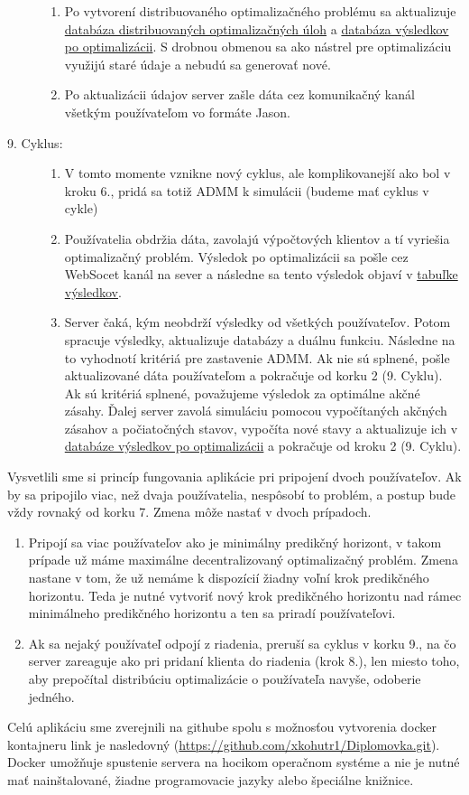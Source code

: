 \begin{description}
{\begin{enumerate}
{		}
		\item{
			Po vytvorení distribuovaného optimalizačného problému sa aktualizuje \hyperref[DB:WORKER]{databáza distribuovaných optimalizačných úloh} a \hyperref[DB:WORKER_DATA]{databáza výsledkov po optimalizácii}. S drobnou obmenou sa ako nástrel pre optimalizáciu využijú staré údaje a nebudú sa generovať nové. 
		}
		\item{
			Po aktualizácii údajov server zašle dáta cez komunikačný kanál všetkým používateľom vo formáte Jason.
		}
	\end{enumerate}
}
\item[9. Cyklus:]{\hfill
	\begin{enumerate}
		\item{V tomto momente vznikne nový cyklus, ale komplikovanejší ako bol v kroku 6., pridá sa totiž ADMM k simulácii (budeme mať cyklus v cykle)}
		\item{Používatelia obdržia dáta, zavolajú výpočtových klientov a tí vyriešia optimalizačný problém. Výsledok po optimalizácii sa pošle cez WebSocet kanál na sever a následne sa tento výsledok objaví v \hyperref[fig:Tabulka]{tabuľke výsledkov}.}
		\item{
			Server čaká, kým neobdrží výsledky od všetkých používateľov. Potom spracuje výsledky, aktualizuje databázy a duálnu funkciu. Následne na to vyhodnotí kritériá pre zastavenie ADMM. Ak nie sú splnené, pošle aktualizované dáta používateľom a pokračuje od korku 2 (9. Cyklu). Ak sú kritériá splnené, považujeme výsledok za optimálne akčné zásahy. Ďalej server zavolá simuláciu pomocou vypočítaných akčných zásahov a počiatočných stavov, vypočíta nové stavy a aktualizuje ich v \hyperref[DB:WORKER_DATA]{databáze výsledkov po optimalizácii} a pokračuje od kroku 2 (9. Cyklu).
		}
	\end{enumerate}
}
\end{description}
Vysvetlili sme si princíp fungovania aplikácie pri pripojení dvoch používateľov. Ak by sa pripojilo viac, než dvaja používatelia, nespôsobí to problém, a postup bude vždy rovnaký od korku 7. Zmena môže nastať v dvoch prípadoch.
\begin{enumerate}
	\item{
	 Pripojí sa viac používateľov ako je minimálny predikčný horizont, v takom prípade už máme maximálne decentralizovaný optimalizačný problém. Zmena nastane v tom, že už nemáme k dispozícií žiadny voľní krok predikčného horizontu. Teda je nutné vytvoriť nový krok predikčného horizontu nad rámec minimálneho predikčného horizontu a ten sa priradí používateľovi.
	}
	\item{
	Ak sa nejaký používateľ odpojí z riadenia, preruší sa cyklus v korku 9., na čo server zareaguje ako pri pridaní klienta do riadenia (krok 8.), len miesto toho, aby prepočítal distribúciu optimalizácie o používateľa navyše, odoberie jedného. 
	}
\end{enumerate}
Celú aplikáciu sme zverejnili na githube spolu s možnosťou vytvorenia docker kontajneru link je nasledovný (\url{https://github.com/xkohutr1/Diplomovka.git}). Docker umožňuje spustenie servera na hocikom operačnom systéme a nie je nutné mať nainštalované, žiadne programovacie jazyky alebo špeciálne knižnice.

